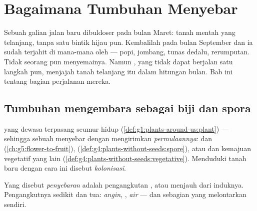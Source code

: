 \chapter{Bagaimana Tumbuhan Menyebar}\label{ch:g6:how-plants-spread}

Sebuah galian jalan baru dibuldoser pada bulan Maret: tanah mentah
yang telanjang, tanpa satu bintik hijau pun. Kembalilah pada bulan
September dan ia sudah terjahit di mana-mana oleh  --- 
popi, jombang, tunas dedalu, rerumputan. Tidak seorang pun
menyemainya. Namun , yang tidak dapat berjalan satu langkah
pun, menjajah tanah telanjang itu dalam hitungan bulan. Bab ini
tentang bagian perjalanan mereka.

\section{Tumbuhan mengembara sebagai biji dan spora}

\begin{proposition}\label{prop:g6:how-plants-spread:travel}
 yang dewasa terpasang seumur hidup
(\cref{def:g1:plants-around-us:plant}) --- sehingga sebuah 
menyebar dengan mengirimkan \emph{permulaannya}:  dan 
(\cref{ch:g5:flower-to-fruit}), 
(\cref{def:g4:plants-without-seeds:spore}), atau  dan
kemajuan vegetatif yang lain
(\cref{def:g4:plants-without-seeds:vegetative}). Menduduki tanah baru
dengan cara ini disebut
\emph{kolonisasi}.
\end{proposition}
\admitted

\begin{definition}[Penyebaran]\label{def:g6:how-plants-spread:dispersal}
Yang disebut \emph{penyebaran} adalah pengangkutan
,  atau  menjauh dari  induknya. Pengangkutnya
sedikit dan tua: \emph{angin}, \emph{}, \emph{air} --- dan
sebagian  yang melontarkan  sendiri.
\end{definition}

